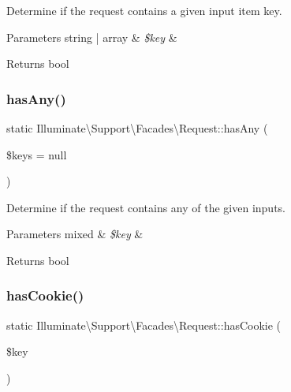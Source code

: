 Determine if the request contains a given input item key.


\begin{DoxyParams}[1]{Parameters}
string | array & {\em \$key} & \\
\hline
\end{DoxyParams}
\begin{DoxyReturn}{Returns}
bool 
\end{DoxyReturn}
\mbox{\label{class_illuminate_1_1_support_1_1_facades_1_1_request_a16f3ecff134eb810a48c7111c7edc3e2}} 
\subsubsection{\texorpdfstring{has\+Any()}{hasAny()}}
{\footnotesize\ttfamily static Illuminate\textbackslash{}\+Support\textbackslash{}\+Facades\textbackslash{}\+Request\+::has\+Any (\begin{DoxyParamCaption}\item[{}]{\$keys = {\ttfamily null} }\end{DoxyParamCaption})\hspace{0.3cm}{\ttfamily [static]}}

Determine if the request contains any of the given inputs.


\begin{DoxyParams}[1]{Parameters}
mixed & {\em \$key} & \\
\hline
\end{DoxyParams}
\begin{DoxyReturn}{Returns}
bool 
\end{DoxyReturn}
\mbox{\label{class_illuminate_1_1_support_1_1_facades_1_1_request_a584ecc81891467684ae97ca5e12bc6b3}} 
\subsubsection{\texorpdfstring{has\+Cookie()}{hasCookie()}}
{\footnotesize\ttfamily static Illuminate\textbackslash{}\+Support\textbackslash{}\+Facades\textbackslash{}\+Request\+::has\+Cookie (\begin{DoxyParamCaption}\item[{}]{\$key }\end{DoxyParamCaption})\hspace{0.3cm}{\ttfamily [static]}}

